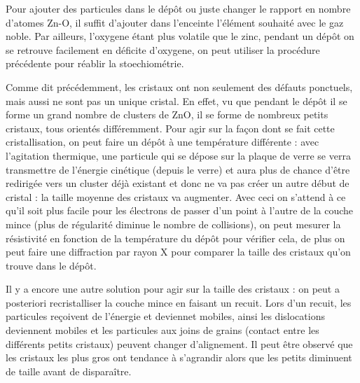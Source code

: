 \documentclass[a4paper,12pt,oneside]{article}
\begin{document}
Pour ajouter des particules dans le dépôt ou juste changer le rapport en nombre d'atomes Zn-O, il suffit d'ajouter dans l'enceinte l'élément souhaité avec le gaz noble. Par ailleurs, l'oxygene étant plus volatile que le zinc, pendant un dépôt on se retrouve facilement en déficite d'oxygene, on peut utiliser la procédure précédente pour réablir la stoechiométrie.


Comme dit précédemment, les cristaux ont non seulement des défauts ponctuels, mais aussi ne sont pas un unique cristal. En effet, vu que pendant le dépôt il se forme un grand nombre de clusters de ZnO, il se forme de nombreux petits cristaux, tous orientés différemment. Pour agir sur la façon dont se fait cette cristallisation, on peut faire un dépôt à une température différente : avec l'agitation thermique, une particule qui se dépose sur la plaque de verre se verra transmettre de l'énergie cinétique (depuis le verre) et aura plus de chance d'être redirigée vers un cluster déjà existant et donc ne va pas créer un autre début de cristal : la taille moyenne des cristaux va augmenter. Avec ceci on s'attend à ce qu'il soit plus facile pour les électrons de passer d'un point à l'autre de la couche mince (plus de régularité diminue le nombre de collisions), on peut mesurer la résistivité en fonction de la température du dépôt pour vérifier cela, de plus on peut faire une diffraction par rayon X pour comparer la taille des cristaux qu'on trouve dans le dépôt.

Il y a encore une autre solution pour agir sur la taille des cristaux : on peut a posteriori recristalliser la couche mince en faisant un recuit. Lors d'un recuit, les particules reçoivent de l'énergie et deviennet mobiles, ainsi les dislocations deviennent mobiles et les particules aux joins de grains (contact entre les différents petits cristaux) peuvent changer d'alignement. Il peut être observé que les cristaux les plus gros ont tendance à s'agrandir alors que les petits diminuent de taille avant de disparaître. 





\end{document}
